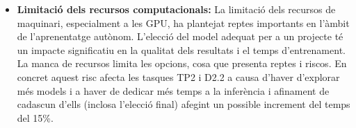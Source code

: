 \begin{itemize}
    \item \textbf{Limitació dels recursos computacionals:} La limitació dels recursos de maquinari, especialment a les GPU, ha plantejat reptes importants en l'àmbit de l'aprenentatge autònom. L'elecció del model adequat per a un projecte té un impacte significatiu en la qualitat dels resultats i el temps d'entrenament. La manca de recursos limita les opcions, cosa que presenta reptes i riscos. En concret aquest risc afecta les tasques TP2 i D2.2 a causa d'haver d'explorar més models i a haver de dedicar més temps a la inferència i afinament de cadascun d'ells (inclosa l'elecció final) afegint un possible increment del temps del 15\%.
\end{itemize}
